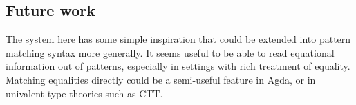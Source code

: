 

\subsection{Future work}


The system here has some simple inspiration that could be extended into pattern matching syntax more generally. 
It seems useful to be able to read equational information out of patterns, especially in settings with rich treatment of equality.
Matching equalities directly could be a semi-useful feature in Agda, or in univalent type theories such as CTT.
